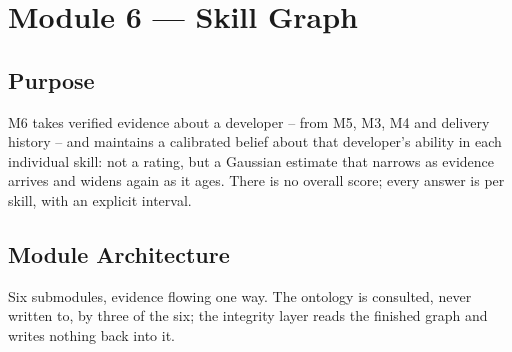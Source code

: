 \documentclass[11pt,a4paper]{article}
\begin{document}
\section{Module 6 --- Skill Graph}

\subsection{Purpose}

M6 takes verified evidence about a developer -- from M5, M3, M4 and delivery
history -- and maintains a calibrated belief about that developer's ability
in each individual skill: not a rating, but a Gaussian estimate that narrows
as evidence arrives and widens again as it ages. There is no overall score;
every answer is per skill, with an explicit interval.

\subsection{Module Architecture}

Six submodules, evidence flowing one way. The ontology is consulted, never
written to, by three of the six; the integrity layer reads the finished
graph and writes nothing back into it.
\end{document}
